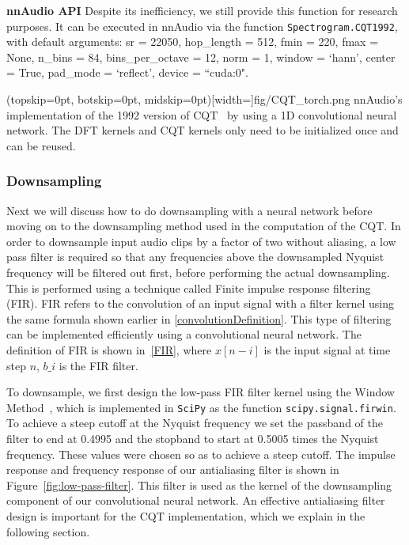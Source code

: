 \documentclass{ieeeaccess}
\newcommand{\nbh}[1]{\texttt{#1}}
\begin{document}
\hspace{11pt} 

\noindent \textbf{nnAudio API} Despite its inefficiency, we still provide this function for research purposes. It can be executed in nnAudio via the function \nbh{Spectrogram.CQT1992}, with default arguments: sr = 22050, hop\_length = 512, fmin = 220, fmax = None, n\_bins = 84, bins\_per\_octave = 12, norm = 1, window = `hann', center = True, pad\_mode = `reflect', device = ``cuda:0".

\Figure[h](topskip=0pt, botskip=0pt, midskip=0pt)[width=\linewidth]{fig/CQT_torch.png}
{nnAudio's implementation of the 1992 version of CQT~\cite{brown1992efficient} by using a 1D convolutional neural network. The DFT kernels and CQT kernels only need to be initialized once and can be reused. \label{fig: CQT_torch}}


\subsubsection{Downsampling}
Next we will discuss how to do downsampling with a neural network before moving on to the downsampling method used in the computation of the CQT. In order to downsample input audio clips by a factor of two without aliasing, a low pass filter is required so that any frequencies above the downsampled Nyquist frequency will be filtered out first, before performing the actual downsampling. This is performed using a technique called Finite impulse response filtering (FIR). FIR refers to the convolution of an input signal with a filter kernel using the same formula shown earlier in \eqref{convolutionDefinition}. This type of filtering can be implemented efficiently using a convolutional neural network.
The definition of FIR is shown in~\eqref{FIR}, where $x[n-i]$ is the input signal at time step $n$, $b\_i$ is the FIR filter. 

To downsample, we first design the low-pass FIR filter kernel using the Window Method~\cite{rajput2012implementation}, which is implemented in \nbh{SciPy} as the function \nbh{scipy.signal.firwin}. To achieve a steep cutoff at the Nyquist frequency we set the passband of the filter to end at 0.4995 and the stopband to start at 0.5005 times the Nyquist frequency. These values were chosen so as to achieve a steep cutoff. The impulse response and frequency response of our antialiasing filter is shown in Figure~\ref{fig:low-pass-filter}. This filter is used as the kernel of the downsampling component of our convolutional neural network. An effective antialiasing filter design is important for the CQT implementation, which we explain in the following section.
\end{document}
